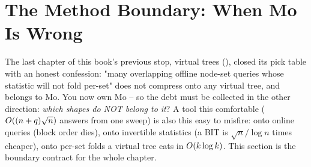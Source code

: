 \section{The Method Boundary: When Mo Is Wrong}\label{sec:c21-boundary}

\begin{previouslybox}
The last chapter of this book's previous stop, virtual trees (),
closed its pick table with an honest confession: "many overlapping offline
node-set queries whose statistic will not fold per-set" does not compress onto
any virtual tree, and belongs to Mo.  You now own Mo -- so the debt must be
collected in the other direction: \emph{which shapes do NOT belong to it}?  A
tool this comfortable (\(O((n+q)\sqrt n)\) answers from one sweep) is also
this easy to misfire: onto online queries (block order dies), onto invertible
statistics (a BIT is \(\sqrt n/\log n\) times cheaper), onto per-set folds a
virtual tree eats in \(O(k\log k)\).  This section is the boundary contract
for the whole chapter.
\end{previouslybox}

